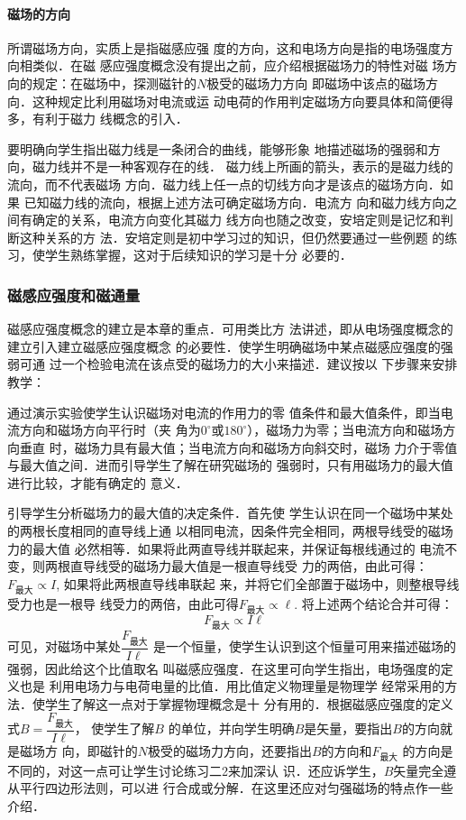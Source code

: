 \paragraph{磁场的方向}
所谓磁场方向，实质上是指磁感应强
度的方向，这和电场方向是指的电场强度方向相类似．在磁
感应强度概念没有提出之前，应介绍根据磁场力的特性对磁
场方向的规定：在磁场中，探测磁针的$N$极受的磁场力方向
即磁场中该点的磁场方向．这种规定比利用磁场对电流或运
动电荷的作用判定磁场方向要具体和简便得多，有利于磁力
线概念的引入．

要明确向学生指出磁力线是一条闭合的曲线，能够形象
地描述磁场的强弱和方向，磁力线并不是一种客观存在的线．
磁力线上所画的箭头，表示的是磁力线的流向，而不代表磁场
方向．磁力线上任一点的切线方向才是该点的磁场方向．如果
已知磁力线的流向，根据上述方法可确定磁场方向．电流方
向和磁力线方向之间有确定的关系，电流方向变化其磁力
线方向也随之改变，安培定则是记忆和判断这种关系的方
法．安培定则是初中学习过的知识，但仍然要通过一些例题
的练习，使学生熟练掌握，这对于后续知识的学习是十分
必要的．

\subsubsection{磁感应强度和磁通量}
磁感应强度概念的建立是本章的重点．可用类比方
法讲述，即从电场强度概念的建立引入建立磁感应强度概念
的必要性．使学生明确磁场中某点磁感应强度的强弱可通
过一个检验电流在该点受的磁场力的大小来描述．建议按以
下步骤来安排教学：

通过演示实验使学生认识磁场对电流的作用力的零
值条件和最大值条件，即当电流方向和磁场方向平行时（夹
角为$0^{\circ}$或$180^{\circ}$），磁场力为零；当电流方向和磁场方向垂直
时，磁场力具有最大值；当电流方向和磁场方向斜交时，磁场
力介于零值与最大值之间．进而引导学生了解在研究磁场的
强弱时，只有用磁场力的最大值进行比较，才能有确定的
意义．

引导学生分析磁场力的最大值的决定条件．首先使
学生认识在同一个磁场中某处的两根长度相同的直导线上通
以相同电流，因条件完全相同，两根导线受的磁场力的最大值
必然相等．如果将此两直导线并联起来，并保证每根线通过的
电流不变，则两根直导线受的磁场力最大值是一根直导线受
力的两倍，由此可得：$F_{\text{最大}}\propto I$, 如果将此两根直导线串联起
来，并将它们全部置于磁场中，则整根导线受力也是一根导
线受力的两倍，由此可得$F_{\text{最大}}\propto \ell$. 将上述两个结论合并可得：
\[F_{\text{最大}}\propto I\ell\]
可见，对磁场中某处$\dfrac{F_{\text{最大}}}{I\ell}$
是一个恒量，使学生认识到这个恒量可用来描述磁场的强弱，因此给这个比值取名
叫磁感应强度．在这里可向学生指出，电场强度的定义也是
利用电场力与电荷电量的比值．用比值定义物理量是物理学
经常采用的方法．使学生了解这一点对于掌握物理概念是十
分有用的．根据磁感应强度的定义
式$B=\dfrac{F_{\text{最大}}}{I\ell}$，
使学生了解$B$
的单位，并向学生明确$B$是矢量，要指出$B$的方向就是磁场方
向，即磁针的$N$极受的磁场力方向，还要指出$B$的方向和$F_{\text{最大}}$
的方向是不同的，对这一点可让学生讨论练习二2来加深认
识．还应诉学生，$B$矢量完全遵从平行四边形法则，可以进
行合成或分解．在这里还应对匀强磁场的特点作一些介绍．

